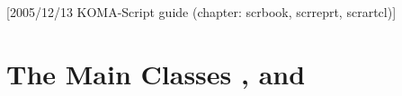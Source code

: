 %
%
%
%
%
%
%
%
% 
%
%
%
%

[2005/12/13 KOMA-Script guide (chapter:
scrbook, scrreprt, scrartcl)]


\chapter{The Main Classes ,  and
  }

%

